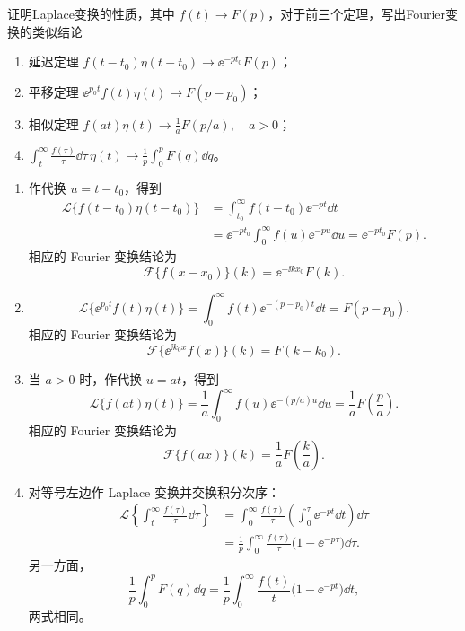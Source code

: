 
\begin{question}
证明Laplace变换的性质，其中 \(f(t) \to F(p)\)，对于前三个定理，写出Fourier变换的类似结论
\begin{enumerate}
  \item 延迟定理 \(f(t-t_0) \eta(t-t_0) \to \ee^{-p t_0} F(p)\)；
  \item 平移定理 \(\ee^{p_0 t} f(t) \eta(t) \to F(p-p_0)\)；
  \item 相似定理 \(f(a t) \eta(t) \to \frac1a F(p/a),\quad a>0\)；
  \item \(\displaystyle\int_t^\infty \frac{f(\tau)}{\tau}\dd{\tau}\, \eta(t) \to \frac1p \int_0^p F(q)\dd{q}\)。
\end{enumerate}

\begin{solution}
\begin{enumerate}
  \item 作代换 \(u=t-t_0\)，得到
  \[
  \begin{aligned}
  \mathcal{L}\{f(t-t_0)\eta(t-t_0)\}
  &=\int_{t_0}^{\infty}f(t-t_0)\ee^{-pt}\dd{t}\\
  &=\ee^{-pt_0}\int_0^\infty f(u)\ee^{-pu}\dd{u}
  =\ee^{-pt_0}F(p).
  \end{aligned}
  \]
  相应的 Fourier 变换结论为
  \[
  \mathcal{F}\{f(x-x_0)\}(k)=\ee^{-\ii kx_0}F(k).
  \]

  \item
  \[
  \mathcal{L}\{\ee^{p_0t}f(t)\eta(t)\}
  =\int_0^\infty f(t)\ee^{-(p-p_0)t}\dd{t}
  =F(p-p_0).
  \]
  相应的 Fourier 变换结论为
  \[
  \mathcal{F}\{\ee^{\ii k_0x}f(x)\}(k)=F(k-k_0).
  \]

  \item 当 \(a>0\) 时，作代换 \(u=at\)，得到
  \[
  \mathcal{L}\{f(at)\eta(t)\}
  =\frac1a\int_0^\infty f(u)\ee^{-(p/a)u}\dd{u}
  =\frac1aF\left(\frac pa\right).
  \]
  相应的 Fourier 变换结论为
  \[
  \mathcal{F}\{f(ax)\}(k)=\frac1aF\left(\frac ka\right).
  \]

  \item 对等号左边作 Laplace 变换并交换积分次序：
  \[
  \begin{aligned}
  \mathcal{L}\left\{\int_t^\infty\frac{f(\tau)}{\tau}\dd{\tau}\right\}
  &=\int_0^\infty\frac{f(\tau)}{\tau}
    \left(\int_0^\tau\ee^{-pt}\dd{t}\right)\dd{\tau}\\
  &=\frac1p\int_0^\infty\frac{f(\tau)}{\tau}
    \bigl(1-\ee^{-p\tau}\bigr)\dd{\tau}.
  \end{aligned}
  \]
  另一方面，
  \[
  \frac1p\int_0^pF(q)\dd{q}
  =\frac1p\int_0^\infty\frac{f(t)}{t}
    \bigl(1-\ee^{-pt}\bigr)\dd{t},
  \]
  两式相同。
\end{enumerate}


\end{solution}
\end{question}

